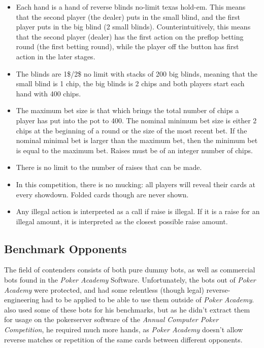 \begin{itemize}
	\item Each hand is a hand of reverse blinds no-limit texas hold-em. This means that the second player (the dealer) puts in the small blind, and the first player puts in the big blind (2 small blinds). Counterintuitively, this means that the second player (dealer) has the first action on the preflop betting round (the first betting round), while the player off the button has first action in the later stages.
	\item The blinds are 1\$/2\$ no limit with stacks of 200 big blinds, meaning that the small blind is 1 chip, the big blinds is 2 chips and both players start each hand with 400 chips.
	\item The maximum bet size is that which brings the total number of chips a player has put into the pot to 400. The nominal minimum bet size is either 2 chips at the beginning of a round or the size of the most recent bet. If the nominal minimal bet is larger than the maximum bet, then the minimum bet is equal to the maximum bet. Raises must be of an integer number of chips. 
	\item There is no limit to the number of raises that can be made.
	\item In this competition, there is no mucking: all players will reveal their cards at every showdown. Folded cards though are never shown.
	\item Any illegal action is interpreted as a call if raise is illegal. If it is a raise for an illegal amount, it is interpreted as the closest possible raise amount.
\end{itemize}

\subsection{Benchmark Opponents}

The field of contenders consists of both pure dummy bots, as well as commercial bots found in the \textit{Poker Academy} Software. Unfortunately, the bots out of \textit{Poker Academy} were protected, and had some relentless (though legal) reverse-engineering had to be applied to be able to use them outside of \textit{Poker Academy}. \cite{Andersson2006} also used some of these bots for his benchmarks, but as he didn't extract them for usage on the pokerserver software of the \textit{Annual Computer Poker Competition}, he required much more hands, as  \textit{Poker Academy} doesn't allow reverse matches or repetition of the same cards between different opponents.

